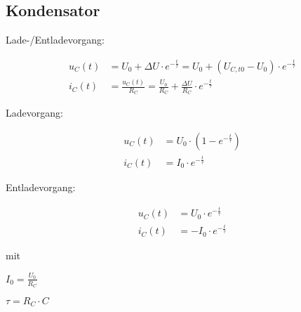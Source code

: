 \begin{sectionbox}
	\subsection{Kondensator}

	Lade-/Entladevorgang:
	\begin{emphbox}
		\begin{align*}
			u_C(t) &= U_0+ ΔU \cdot e^{-{\frac{t}{τ}}} = U_0+ (U_{C,t0}-U_0) \cdot e^{-{\frac{t}{τ}}} \\
			i_C(t) &= \frac{u_C(t)}{R_C} = \frac{U_0}{R_C}+\frac{ΔU}{R_C}\cdot e^{-{\frac{t}{τ}}}
		\end{align*}
	\end{emphbox}

	Ladevorgang:
	\begin{emphbox}
		\begin{align*}
			u_C(t) &= U_0 \cdot (1-e^{-{\frac{t}{τ}}}) \\
			i_C(t) &= I_0 \cdot e^{-{\frac{t}{τ}}}
		\end{align*}
	\end{emphbox}

	Entladevorgang:
	\begin{emphbox}
		\begin{align*}
			u_C(t) &= U_0 \cdot e^{-{\frac{t}{τ}}} \\
			i_C(t) &= -I_0 \cdot e^{-{\frac{t}{τ}}}
		\end{align*}
	\end{emphbox}

mit
\begin{emphbox}
	$I_0 = \frac{U_0}{R_C}$
	
	$τ = R_C \cdot C$
\end{emphbox}

	
\end{sectionbox}

